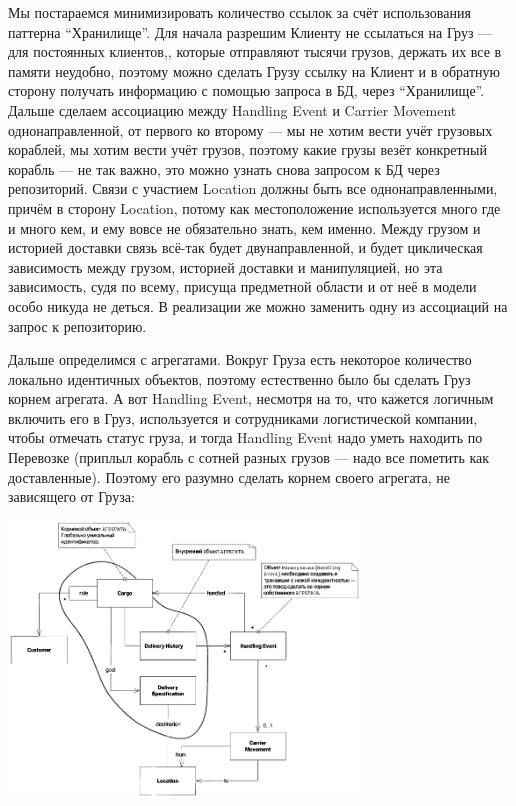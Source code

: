 \documentclass[a5paper]{article}
\begin{document}
Мы постараемся минимизировать количество ссылок за счёт использования паттерна ``Хранилище''. Для начала разрешим Клиенту не ссылаться на Груз --- для постоянных клиентов,, которые отправляют тысячи грузов, держать их все в памяти неудобно, поэтому можно сделать Грузу ссылку на Клиент и в обратную сторону получать информацию с помощью запроса в БД, через ``Хранилище''. Дальше сделаем ассоциацию между Handling Event и Carrier Movement однонаправленной, от первого ко второму --- мы не хотим вести учёт грузовых кораблей, мы хотим вести учёт грузов, поэтому какие грузы везёт конкретный корабль --- не так важно, это можно узнать снова запросом к БД через репозиторий. Связи с участием Location должны быть все однонаправленными, причём в сторону Location, потому как местоположение используется много где и много кем, и ему вовсе не обязательно знать, кем именно. Между грузом и историей доставки связь всё-так будет двунаправленной, и будет циклическая зависимость между грузом, историей доставки и манипуляцией, но эта зависимость, судя по всему, присуща предметной области и от неё в модели особо никуда не деться. В реализации же можно заменить одну из ассоциаций на запрос к репозиторию.

Дальше определимся с агрегатами. Вокруг Груза есть некоторое количество локально идентичных объектов, поэтому естественно было бы сделать Груз корнем агрегата. А вот Handling Event, несмотря на то, что кажется логичным включить его в Груз, используется и сотрудниками логистической компании, чтобы отмечать статус груза, и тогда Handling Event надо уметь находить по Перевозке (приплыл корабль с сотней разных грузов --- надо все пометить как доставленные). Поэтому его разумно сделать корнем своего агрегата, не зависящего от Груза:

\begin{center}
    \includegraphics[width=0.7\textwidth]{cargoAggregates.png}
\end{center}
\end{document}
